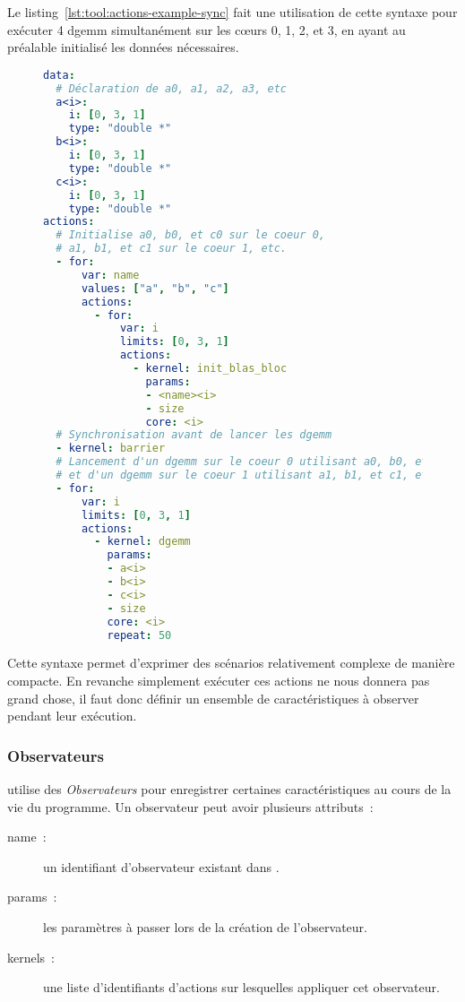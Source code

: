 Le listing~\ref{lst:tool:actions-example-sync} fait une utilisation de cette syntaxe pour exécuter 4 dgemm simultanément sur les cœurs 0, 1, 2, et 3, en ayant au préalable initialisé les données nécessaires.

\begin{figure}[h!]
\begin{lstlisting}[language=yaml,caption=Exemple de déclaration d'actions synchronisées,label=lst:tool:actions-example-sync]
data:
  # Déclaration de a0, a1, a2, a3, etc
  a<i>:
    i: [0, 3, 1]
    type: "double *"
  b<i>:
    i: [0, 3, 1]
    type: "double *"
  c<i>:
    i: [0, 3, 1]
    type: "double *"
actions:
  # Initialise a0, b0, et c0 sur le coeur 0,
  # a1, b1, et c1 sur le coeur 1, etc.
  - for:
      var: name
      values: ["a", "b", "c"]
      actions:
        - for:
            var: i
            limits: [0, 3, 1]
            actions:
              - kernel: init_blas_bloc
                params:
                - <name><i>
                - size
                core: <i>
  # Synchronisation avant de lancer les dgemm
  - kernel: barrier
  # Lancement d'un dgemm sur le coeur 0 utilisant a0, b0, et c0,
  # et d'un dgemm sur le coeur 1 utilisant a1, b1, et c1, etc.
  - for:
      var: i
      limits: [0, 3, 1]
      actions:
        - kernel: dgemm
          params:
          - a<i>
          - b<i>
          - c<i>
          - size
          core: <i>
          repeat: 50
\end{lstlisting}
\end{figure}

Cette syntaxe permet d'exprimer des scénarios relativement complexe de manière compacte.
En revanche simplement exécuter ces actions ne nous donnera pas grand chose, il faut donc définir un ensemble de caractéristiques à observer pendant leur exécution.

\subsubsection{Observateurs}

\outil utilise des \emph{Observateurs} pour enregistrer certaines caractéristiques au cours de la vie du programme.
Un observateur peut avoir plusieurs attributs~:
\begin{description}
  \item [name~:] un identifiant d'observateur existant dans \outil.
  \item [params~:] les paramètres à passer lors de la création de l'observateur.
  \item [kernels~:] une liste d'identifiants d'actions sur lesquelles appliquer cet observateur.
\end{description}

